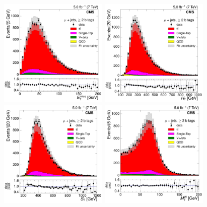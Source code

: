 \begin{figure}[hbtp]
    \centering
     \includegraphics[width=0.46\textwidth]{Chapters/07_08_09_Analysis/Images/control_plots/after_fit/7TeV/MuPlusJets_patType1CorrectedPFMet_2orMoreBtags_with_ratio}\hfill
     \includegraphics[width=0.46\textwidth]{Chapters/07_08_09_Analysis/Images/control_plots/after_fit/7TeV/MuPlusJets_HT_2orMoreBtags_with_ratio}\\                            
     \includegraphics[width=0.46\textwidth]{Chapters/07_08_09_Analysis/Images/control_plots/after_fit/7TeV/MuPlusJets_patType1CorrectedPFMet_ST_2orMoreBtags_with_ratio}\hfill
     \includegraphics[width=0.46\textwidth]{Chapters/07_08_09_Analysis/Images/control_plots/after_fit/7TeV/MuPlusJets_patType1CorrectedPFMet_MT_2orMoreBtags_with_ratio}\\     

\end{figure}
